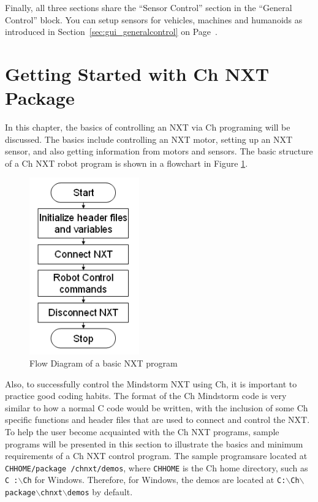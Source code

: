 \documentclass[11pt]{article}
\begin{document}
Finally, all three sections share the ``Sensor Control'' section in the ``General 
Control'' block. You can setup sensors for vehicles, machines and humanoids as
introduced in Section~\ref{sec:gui_generalcontrol} on 
Page~\pageref{sec:gui_generalcontrol}.

\newpage
\section{Getting Started with Ch NXT Package}
In this chapter, the basics of controlling an NXT via Ch programing will be discussed. 
The basics include controlling an NXT motor, setting up an NXT sensor, and also getting 
information from motors and sensors. The basic structure of a Ch NXT robot program 
is shown in a flowchart in Figure \ref{fig_NXT_pstruc}.\\
\begin{figure}[H]
  \begin{center}
    \includegraphics[height=3in]{figure/mindstorm/NXT_pstruc.png}
    \caption{Flow Diagram of a basic NXT program\label{fig_NXT_pstruc}}
  \end{center}
\end{figure}
Also, to successfully control the Mindstorm NXT using Ch, it is important to 
practice good coding habits. The format of the Ch Mindstorm code is very similar 
to how a normal C code would be written, with the inclusion of some Ch specific 
functions and header files that are used to connect and control the NXT. To help 
the user become acquainted with the Ch NXT programs, sample programs will be 
presented in this section to illustrate the basics and minimum requirements of a 
Ch NXT control program. The sample programsare located at {\tt CHHOME/package
/chnxt/demos}, where {\tt CHHOME} is the Ch home directory, such as {\tt C
:$\backslash$Ch} for Windows. Therefore, for Windows, the demos are located at 
{\tt C:$\backslash$Ch$\backslash$package$\backslash$chnxt$\backslash$demos} 
by default.
\end{document}
